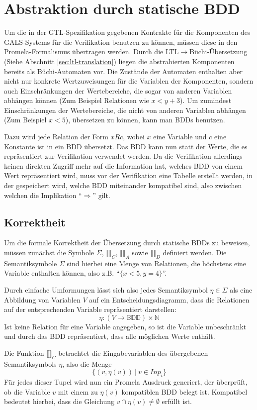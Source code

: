 \section{Abstraktion durch statische BDD}
Um die in der GTL-Spezifikation gegebenen Kontrakte für die Komponenten des GALS-Systems für die Verifikation benutzen zu können, müssen diese in den Promela-Formalismus übertragen werden.
Durch die LTL$\rightarrow$Büchi-Übersetzung (Siehe Abschnitt \ref{sec:ltl-translation}) liegen die abstrahierten Komponenten bereits als Büchi-Automaten vor.
Die Zustände der Automaten enthalten aber nicht nur konkrete Wertzuweisungen für die Variablen der Komponenten, sondern auch Einschränkungen der Wertebereiche, die sogar von anderen Variablen abhängen können (Zum Beispiel Relationen wie $x < y + 3$).
Um zumindest Einschränkungen der Wertebereiche, die nicht von anderen Variablen abhängen (Zum Beispiel $x < 5$), übersetzen zu können, kann man BDDs benutzen.

Dazu wird jede Relation der Form $x R c$, wobei $x$ eine Variable und $c$ eine Konstante ist in ein BDD übersetzt.
Das BDD kann nun statt der Werte, die es repräsentiert zur Verifikation verwendet werden.
Da die Verifikation allerdings keinen direkten Zugriff mehr auf die Information hat, welches BDD von einem Wert repräsentiert wird, muss vor der Verifikation eine Tabelle erstellt werden, in der gespeichert wird, welche BDD miteinander kompatibel sind, also zwischen welchen die Implikation "`$\Rightarrow$"' gilt.
\subsection{Korrektheit}
Um die formale Korrektheit der Übersetzung durch statische BDDs zu beweisen, müssen zunächst die Symbole $\Sigma$, $\llbracket\rrbracket_C$, $\llbracket\rrbracket_A$ sowie $\llbracket\rrbracket_D$ definiert werden.
Die Semantiksymbole $\Sigma$ sind hierbei eine Menge von Relationen, die höchstens eine Variable enthalten können, also z.B. "`$\{x<5,y=4\}$"'.

Durch einfache Umformungen lässt sich also jedes Semantiksymbol $\eta\in\Sigma$ als eine Abbildung von Variablen $V$ auf ein Entscheidungsdiagramm, dass die Relationen auf der entsprechenden Variable repräsentiert darstellen:
\[ \eta : (V\rightarrow \mathbb{BDD})\times\mathbb{N} \]
Ist keine Relation für eine Variable angegeben, so ist die Variable unbeschränkt und durch das BDD repräsentiert, dass alle möglichen Werte enthält.

Die Funktion $\llbracket\rrbracket_C$ betrachtet die Eingabevariablen des übergebenen Semantiksymbols $\eta$, also die Menge
\[ \{ (v,\eta(v))\ |\ v\in \mathit{Inp}_i \} \]
Für jedes dieser Tupel wird nun ein Promela Ausdruck generiert, der überprüft, ob die Variable $v$ mit einem zu $\eta(v)$ kompatiblen BDD belegt ist.
Kompatibel bedeutet hierbei, dass die Gleichung $v\cap\eta(v)\neq \emptyset$ erfüllt ist.